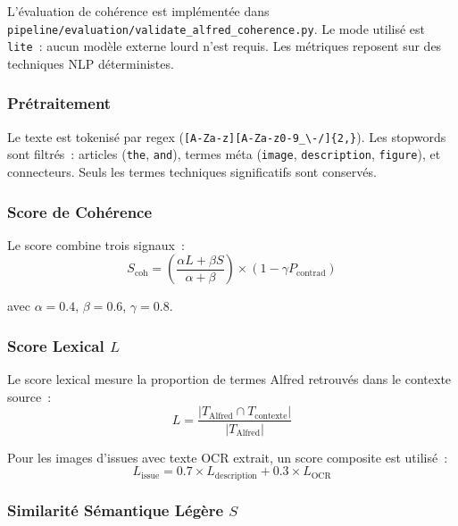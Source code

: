 L'évaluation de cohérence est implémentée dans \texttt{pipeline/evaluation/validate\_alfred\_coherence.py}. Le mode utilisé est \texttt{lite}~: aucun modèle externe lourd n'est requis. Les métriques reposent sur des techniques NLP déterministes.

\subsubsection{Prétraitement}

Le texte est tokenisé par regex (\texttt{[A-Za-z][A-Za-z0-9\_\textbackslash{}-/]\{2,\}}). Les stopwords sont filtrés~: articles (\texttt{the}, \texttt{and}), termes méta (\texttt{image}, \texttt{description}, \texttt{figure}), et connecteurs. Seuls les termes techniques significatifs sont conservés.

\subsubsection{Score de Cohérence}

Le score combine trois signaux~:
\begin{equation}
S_{\text{coh}} = \left(\frac{\alpha L + \beta S}{\alpha + \beta}\right) \times (1 - \gamma P_{\text{contrad}})
\label{eq:coherence_score}
\end{equation}

avec $\alpha = 0.4$, $\beta = 0.6$, $\gamma = 0.8$.

\subsubsection{Score Lexical $L$}

Le score lexical mesure la proportion de termes Alfred retrouvés dans le contexte source~:
\begin{equation}
L = \frac{|T_{\text{Alfred}} \cap T_{\text{contexte}}|}{|T_{\text{Alfred}}|}
\label{eq:lexical_score}
\end{equation}

Pour les images d'issues avec texte OCR extrait, un score composite est utilisé~:
\begin{equation}
L_{\text{issue}} = 0.7 \times L_{\text{description}} + 0.3 \times L_{\text{OCR}}
\label{eq:lexical_issue}
\end{equation}

\subsubsection{Similarité Sémantique Légère $S$}

